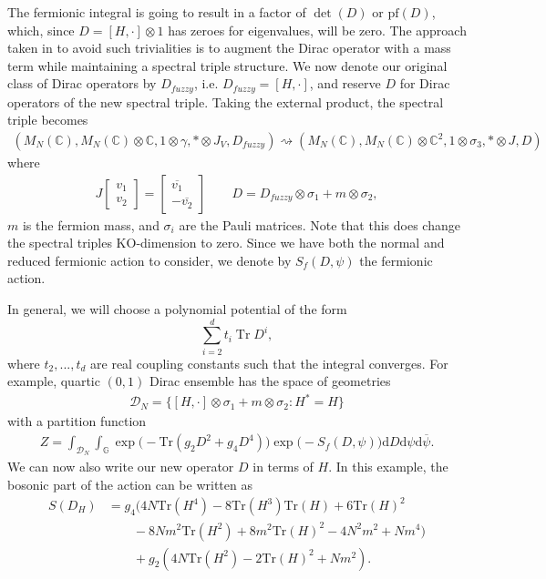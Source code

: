 \documentclass[10pt]{article}
\newcommand{\cc}{\mathbb{C}}
\newcommand{\dif}{\mathrm{d}}
\newcommand{\trace}[1]{\text{Tr}(#1)}
\theoremstyle{plain}
\theoremstyle{definition}
\DeclareMathOperator{\tr}{Tr}
\theoremstyle{plain}
\begin{document}
The fermionic integral is going to result in a factor of $\det(D)$ or $\text{pf}({D})$, which, since $D=[H,\cdot]\otimes 1$ has zeroes for eigenvalues, will be zero. The approach taken in \cite{khalkhali2024large}  to avoid such trivialities is to augment the Dirac operator with a mass term while maintaining a spectral triple structure. We now denote our original class of Dirac operators by $D_{fuzzy}$, i.e. $D_{fuzzy} = [H,\cdot]$, and reserve $D$ for Dirac operators  of the new spectral triple. Taking the external product, the spectral triple becomes
\begin{align*}
	(M_N(\cc),M_{N}(\cc)\otimes\cc,1\otimes \gamma,*\otimes J_V,D_{fuzzy})\rightsquigarrow (M_N(\cc),M_{N}(\cc)\otimes \cc^2,1\otimes \sigma_3,*\otimes J, D)
\end{align*}
where 
\begin{align}
	J\begin{bmatrix}
		v_1 \\ v_2 
	\end{bmatrix} = \begin{bmatrix}
	\overline{v_1} \\ -\overline{v_2}
	\end{bmatrix} \qquad D = D_{fuzzy}\otimes \sigma_1 + m\otimes\sigma_2, \label{modified dirac}
\end{align}
$m$ is the fermion mass, and $\sigma_i$ are the Pauli matrices. Note that this does change the spectral triples KO-dimension to zero. Since we have both the normal and reduced fermionic action to consider, we denote by $S_{f}(D,\psi)$ the fermionic action. 

In general, we will choose a polynomial potential of the form 
\begin{equation*}
     \sum_{i=2}^{d}t_{i} \tr D^{i},
\end{equation*}
where $t_{2},...,t_{d}$ are real coupling constants such that the integral converges. For example, quartic $(0,1)$ Dirac ensemble has the space of geometries 
	\begin{align*}
		\mathcal{D}_N = \{ [H,\cdot]\otimes\sigma_1 + m\otimes\sigma_2 : H^*=H \}
	\end{align*}
	with a partition function
	\begin{align*}
		Z = \int_{\mathcal{D}_{N}} \int_{\mathbb{G}}\exp\bigg( -\trace{g_2 D^2+g_4 D^4} \bigg)\exp\bigg( -S_f(D,\psi) \bigg)\dif D \dif\psi\dif\overline{\psi}.
	\end{align*}
    We can now also write our new operator $D$ in terms of $H$. In this example, the bosonic part of the action can be written as 
\begin{align*}
	S(D_H)&=g_4(4N\trace{H^4}-8\trace{H^3}\trace{H}+6\trace{H}^2 \\ &\qquad-8Nm^2\trace{H^2}+8m^2\trace{H}^2-4N^2m^2+Nm^4)\\&\qquad+g_2(4N\trace{H^2}-2\trace{H}^2 + Nm^2).
\end{align*}
\end{document}
